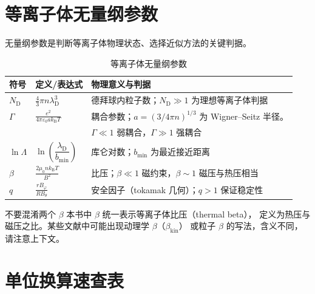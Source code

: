 \documentclass[12pt,a4paper,openany,oneside]{book}
\newcommand{\eps}{\varepsilon}
\begin{document}
\section*{等离子体无量纲参数}
{}

无量纲参数是判断等离子体物理状态、选择近似方法的关键判据。

\begin{table}[htbp]
\centering
\caption{等离子体无量纲参数}
\begin{tabular}{@{}llp{6.5cm}@{}}
\toprule
\textbf{符号} & \textbf{定义/表达式} & \textbf{物理意义与判据} \\
\midrule
$N_\mathrm{D}$ & $\tfrac{4}{3}\pi n\lambda_\mathrm{D}^3$ & 德拜球内粒子数；$N_\mathrm{D}\gg 1$ 为理想等离子体判据 \\
$\Gamma$ & $\displaystyle\frac{e^2}{4\pi\eps_0 a k_\mathrm{B} T}$ & 耦合参数；$a=(3/4\pi n)^{1/3}$ 为 Wigner--Seitz 半径。\\ & & $\Gamma\ll 1$ 弱耦合，$\Gamma\gg 1$ 强耦合 \\
$\ln\Lambda$ & $\ln\left(\dfrac{\lambda_\mathrm{D}}{b_{\min}}\right)$ & 库仑对数；$b_{\min}$ 为最近接近距离 \\
$\beta$ & $\displaystyle\frac{2\mu_0 n k_\mathrm{B} T}{B^2}$ & 比压；$\beta\ll 1$ 磁约束，$\beta\sim 1$ 磁压与热压相当 \\
$q$ & $\displaystyle\frac{r B_\varphi}{R B_\theta}$ & 安全因子（tokamak 几何）；$q>1$ 保证稳定性 \\
\bottomrule
\end{tabular}
\end{table}

\begin{warning}{不要混淆两个 $\beta$}{}
本书中 $\beta$ 统一表示等离子体比压（thermal beta），
定义为热压与磁压之比。某些文献中可能出现动理学 $\beta$（$\beta_{\mathrm{kin}}$）
或粒子 $\beta$ 的写法，含义不同，请注意上下文。
\end{warning}


\section*{单位换算速查表}
{}
\end{document}
